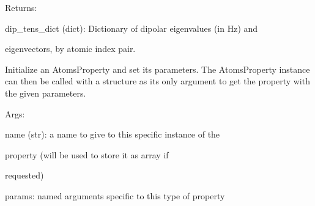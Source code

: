 \documentclass[letterpaper,10pt,english]{sphinxmanual}
\begin{document}
\begin{fulllineitems}
\begin{DUlineblock}{0em}
\item[] Returns: 
\item[]
\begin{DUlineblock}{\DUlineblockindent}
\item[] dip\_tens\_dict (dict): Dictionary of dipolar eigenvalues (in Hz) and
\item[]
\begin{DUlineblock}{\DUlineblockindent}
\item[] eigenvectors, by atomic index pair.
\end{DUlineblock}
\end{DUlineblock}
\end{DUlineblock}

Initialize an AtomsProperty and set its parameters.
The AtomsProperty instance can then be called with a structure as its
only argument to get the property with the given parameters.

\begin{DUlineblock}{0em}
\item[] Args:
\item[]
\begin{DUlineblock}{\DUlineblockindent}
\item[] name (str): a name to give to this specific instance of the
\item[]
\begin{DUlineblock}{\DUlineblockindent}
\item[] property (will be used to store it as array if
\item[] requested)
\end{DUlineblock}
\item[] params: named arguments specific to this type of property
\end{DUlineblock}
\end{DUlineblock}

\begin{fulllineitems}
\label{doctree/soprano.properties.nmr.dipolar:soprano.properties.nmr.dipolar.DipolarDiagonal.default_name}
\end{fulllineitems}


\begin{fulllineitems}
\label{doctree/soprano.properties.nmr.dipolar:soprano.properties.nmr.dipolar.DipolarDiagonal.default_params}
\end{fulllineitems}


\end{fulllineitems}
\end{document}
